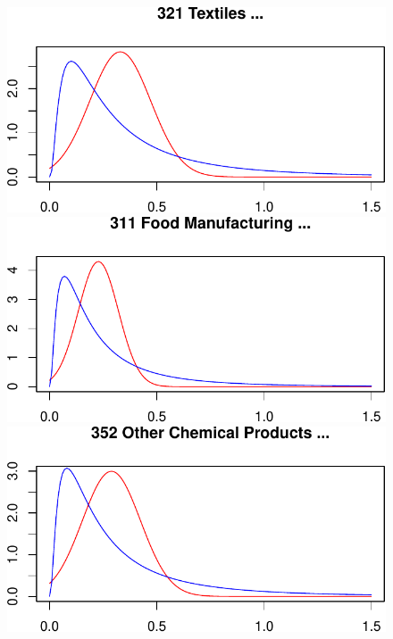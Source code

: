 \documentclass[
  12pt]{article}
\theoremstyle{definition}
\theoremstyle{remark}
\begin{document}
\begin{figure}

\begin{minipage}{\linewidth}

\includegraphics{Tax-Prod_files/figure-pdf/unnamed-chunk-35-1.pdf}

\includegraphics{Tax-Prod_files/figure-pdf/unnamed-chunk-35-2.pdf}

\includegraphics{Tax-Prod_files/figure-pdf/unnamed-chunk-35-3.pdf}


\end{minipage}
\end{figure}
\end{document}
